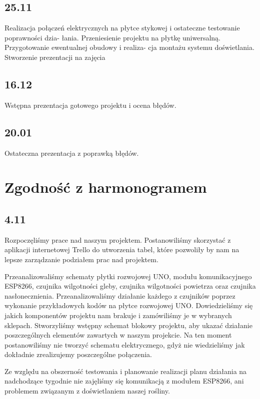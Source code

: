 \documentclass[12pt]{article}
\begin{document}
\subsection{25.11}
Realizacja połączeń elektrycznych na płytce stykowej i ostateczne testowanie poprawności dzia-
łania. Przeniesienie projektu na płytkę uniwersalną. Przygotowanie ewentualnej obudowy i realiza-
cja montażu systemu doświetlania. Stworzenie prezentacji na zajęcia

\subsection{16.12}
Wstępna prezentacja gotowego projektu i ocena błędów.

\subsection{20.01}
Ostateczna prezentacja z poprawką błędów.



\section{Zgodność z harmonogramem}
\subsection{4.11}
Rozpoczęliśmy prace nad naszym projektem. Postanowiliśmy skorzystać z aplikacji internetowej Trello do utworzenia tabel, które pozwoliły by nam na lepsze zarządzanie podziałem prac nad projektem.

Przeanalizowaliśmy schematy płytki rozwojowej UNO, modułu komunikacyjnego ESP8266, czujnika wilgotności gleby, czujnika wilgotności powietrza oraz czujnika nasłonecznienia. Przeanalizowaliśmy działanie każdego z czujników poprzez wykonanie przykładowych kodów na płytce rozwojowej UNO. Dowiedzieliśmy się jakich komponentów projektu nam brakuje i zamówiliśmy je w wybranych sklepach.
Stworzyliśmy wstępny schemat blokowy projektu, aby ukazać działanie poszczególnych elementów zawartych w naszym projekcie. Na ten moment postanowiliśmy nie tworzyć schematu elektrycznego, gdyż nie wiedzieliśmy jak dokładnie zrealizujemy poszczególne połączenia.

Ze względu na obszerność testowania i planowanie realizacji planu działania na nadchodzące tygodnie nie zajęliśmy się komunikacją z modułem ESP8266, ani problemem związanym z doświetlaniem naszej rośliny.
\end{document}
